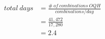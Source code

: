 \documentclass[preview, border=2mm]{standalone}
\begin{document}
\vspace*{\fill}

{\fontsize{32pt}{40pt}\selectfont
    \begin{align*}
        total\ days 
        &= \frac{\#\ of\ combinations\ OQH}{combinations/day} \\
        &= \frac{41{,}472}{17{,}280} \\
        &= 2.4
    \end{align*}
}

\vspace*{\fill}
\end{document}
